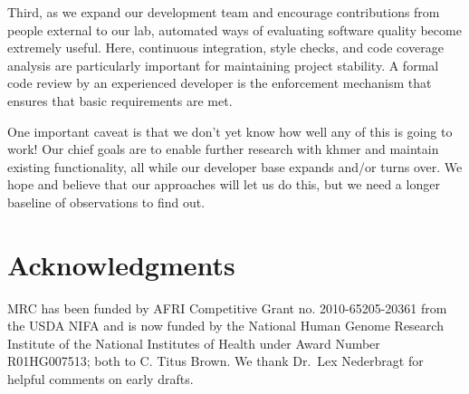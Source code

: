 \documentclass[12pt]{article}
\begin{document}
Third, as we expand our development team and encourage contributions
from people external to our lab, automated ways of evaluating software
quality become extremely useful.  Here, continuous integration, style
checks, and code coverage analysis are particularly important for
maintaining project stability.  A formal code review by an experienced
developer is the enforcement mechanism that ensures that basic requirements
are met.

One important caveat is that we don't yet know how well any of this is
going to work!  Our chief goals are to enable further research with
khmer and maintain existing functionality, all while our
developer base expands and/or turns over. We hope and believe that our
approaches will let us do this, but we need a longer baseline of
observations to find out.







\section*{Acknowledgments}

MRC has been funded by AFRI Competitive Grant no. 2010-65205-20361
from the USDA NIFA and is now funded by the National Human Genome
Research Institute of the National Institutes of Health under Award
Number R01HG007513; both to C. Titus Brown.  We thank Dr.\ Lex
Nederbragt for helpful comments on early drafts.








\end{document}
